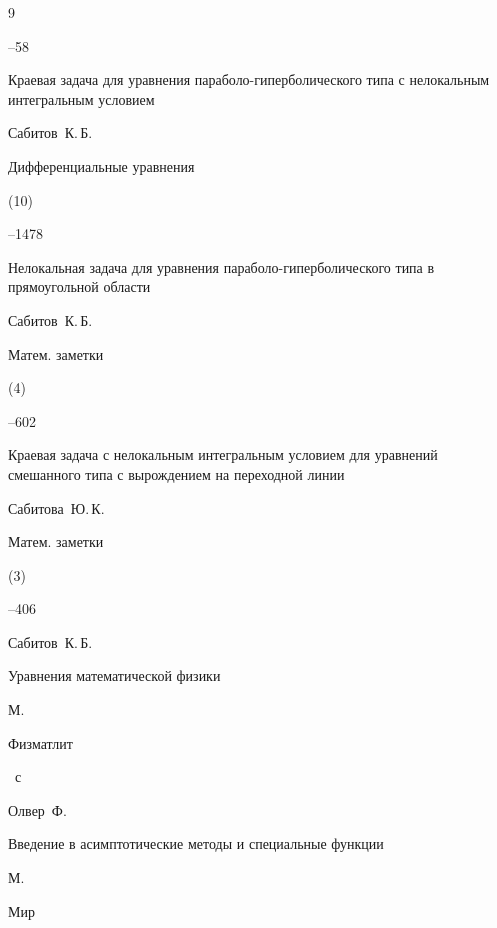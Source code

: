 \begin{thebibliography}{9}

--58




\paper Краевая задача для уравнения параболо-гиперболического типа с нелокальным интегральным условием

\by Сабитов~К.\,Б.

\jour Дифференциальные уравнения


(10)

--1478




\paper Нелокальная задача для уравнения параболо-гиперболического типа в прямоугольной области

\by Сабитов~К.\,Б.

\jour Матем. заметки


(4)

--602




\paper Краевая задача с нелокальным интегральным условием для уравнений смешанного типа с вырождением на переходной линии

\by Сабитова~Ю.\,К.

\jour Матем. заметки


(3)

--406




\by Сабитов~К.\,Б.

\book Уравнения математической физики

\publaddr М.

\publ Физматлит


~с




\by Олвер~Ф.

\book Введение в асимптотические методы и специальные функции

\publaddr М.

\publ Мир



\end{thebibliography}
